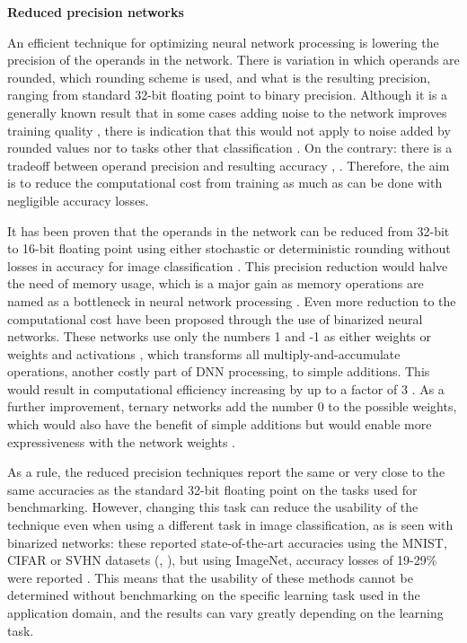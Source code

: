 \textbf{Reduced precision networks}

An efficient technique for optimizing neural network processing is lowering the precision of the operands in the network. There is variation in which operands are rounded, which rounding scheme is used, and what is the resulting precision, ranging from standard 32-bit floating point to binary precision. Although it is a generally known result that in some cases adding noise to the network improves training quality \cite{murray_enhanced_1994}, there is indication that this would not apply to noise added by rounded values \cite{murray_enhanced_1994} nor to tasks other that classification \cite{an_effects_1996}. On the contrary: there is a tradeoff between operand precision and resulting accuracy \cite{de_sa_high-accuracy_2018}, \cite{courbariaux_training_2015}. Therefore, the aim is to reduce the computational cost from training as much as can be done with negligible accuracy losses.

It has been proven that the operands in the network can be reduced from 32-bit to 16-bit floating point using either stochastic or deterministic rounding without losses in accuracy for image classification \cite{pmlr-v37-gupta15} \cite{micikevicius_mixed_2018}. This precision reduction would halve the need of memory usage, which is a major gain as memory operations are named as a bottleneck in neural network processing \cite{sze_efficient_2017}. Even more reduction to the computational cost have been proposed through the use of binarized neural networks. These networks use only the numbers 1 and -1 as either weights \cite{courbariaux_binaryconnect_2016} or weights and activations \cite{courbariaux_binarized_2016},  which transforms all multiply-and-accumulate operations, another costly part of DNN processing, to simple additions. This would result in computational efficiency increasing by up to a factor of 3 \cite{courbariaux_binaryconnect_2016}. As a further improvement, ternary networks add the number 0 to the possible weights, which would also have the benefit of simple additions but would enable more expressiveness with the network weights \cite{li_ternary_2016}.

As a rule, the reduced precision techniques report the same or very close to the same accuracies as the standard 32-bit floating point on the tasks used for benchmarking. However, changing this task can reduce the usability of the technique even when using a different task in image classification, as is seen with binarized networks: these reported state-of-the-art accuracies using the MNIST, CIFAR or SVHN datasets (\cite{courbariaux_binarized_2016}, \cite{courbariaux_binaryconnect_2016}), but using ImageNet, accuracy losses of 19-29\% were reported \cite{leibe_xnor-net_2016}. This means that the usability of these methods cannot be determined without benchmarking on the specific learning task used in the application domain, and the results can vary greatly depending on the learning task.

